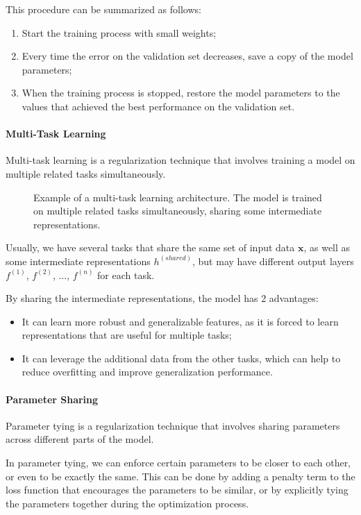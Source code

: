 This procedure can be summarized as follows:
\begin{enumerate}
    \item Start the training process with small weights;
    \item Every time the error on the validation set decreases, save a copy of the model parameters;
    \item When the training process is stopped, restore the model parameters to the values that achieved the best performance on the validation set.
\end{enumerate}

\paragraph{Multi-Task Learning}
Multi-task learning is a regularization technique that involves training a model on multiple related tasks simultaneously.
\begin{figure}[H]
    \centering
    
    \caption{Example of a multi-task learning architecture. 
    The model is trained on multiple related tasks simultaneously, sharing some intermediate representations.}
    \label{fig:multi-task-learning}
\end{figure}

Usually, we have several tasks that share the same set of input data $\boldsymbol{x}$, as well as some intermediate representations $h^{(shared)}$,
but may have different output layers $f^{(1)}$, $f^{(2)}$, ..., $f^{(n)}$ for each task.

By sharing the intermediate representations, the model has 2 advantages:
\begin{itemize}
    \item It can learn more robust and generalizable features, as it is forced to learn representations that are useful for multiple tasks;
    \item It can leverage the additional data from the other tasks, which can help to reduce overfitting and improve generalization performance.
\end{itemize}

\paragraph{Parameter Sharing}
Parameter tying is a regularization technique that involves sharing parameters across different parts of the model.

In parameter tying, we can enforce certain parameters to be closer to each other, or even to be exactly the same. 
This can be done by adding a penalty term to the loss function that encourages the parameters to be similar, or by explicitly tying the parameters together during the optimization process.

